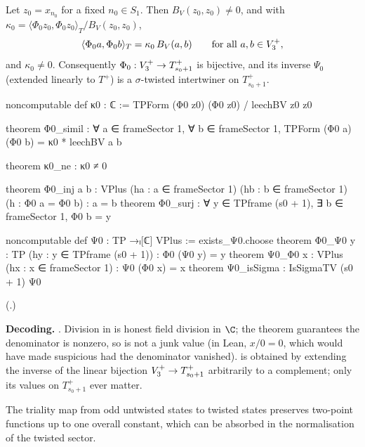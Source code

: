 \begin{theorem}[Similitude]\label{ch14:thm:simil}
Let $z_0=x_{n_0}$ for a fixed $n_0\in S_1$.  Then $B_V(z_0,z_0)\ne0$, and with
$\kappa_0=\langle\Phi_0z_0,\Phi_0z_0\rangle_T/B_V(z_0,z_0)$,
\begin{equation*}
  \langle\Phi_0a,\Phi_0b\rangle_T=\kappa_0\,B_V(a,b)\qquad\text{for all }a,b\in V_3^{+},
\end{equation*}
and $\kappa_0\ne0$.  Consequently $\Phi_0:V_3^{+}\to T_{s_0+1}^+$ is bijective, and its inverse $\Psi_0$ (extended
linearly to $T^+$) is a $\sigma$-twisted intertwiner on $T_{s_0+1}^+$.
\end{theorem}
\begin{leancode}
noncomputable def κ0 : ℂ := TPForm (Φ0 z0) (Φ0 z0) / leechBV z0 z0

theorem Φ0_simil : ∀ a ∈ frameSector 1, ∀ b ∈ frameSector 1,
    TPForm (Φ0 a) (Φ0 b) = κ0 * leechBV a b

theorem κ0_ne : κ0 ≠ 0

theorem Φ0_inj {a b : VPlus} (ha : a ∈ frameSector 1) (hb : b ∈ frameSector 1)
    (h : Φ0 a = Φ0 b) : a = b
theorem Φ0_surj : ∀ y ∈ TPframe (s0 + 1), ∃ b ∈ frameSector 1, Φ0 b = y

noncomputable def Ψ0 : TP →ₗ[ℂ] VPlus := exists_Ψ0.choose
theorem Φ0_Ψ0 {y : TP} (hy : y ∈ TPframe (s0 + 1)) : Φ0 (Ψ0 y) = y
theorem Ψ0_Φ0 {x : VPlus} (hx : x ∈ frameSector 1) : Ψ0 (Φ0 x) = x
theorem Ψ0_isSigma : IsSigmaTV (s0 + 1) Ψ0
\end{leancode}
(.)

\begin{dictionary}
\textbf{Decoding.}  .  Division in  is honest field division in $\C$;
the theorem  guarantees the denominator is nonzero, so  is not
a junk value (in Lean, $x/0=0$, which would have made  suspicious had the denominator
vanished).   is obtained by extending the inverse of the linear bijection
$V_3^{+}\to T_{s_0+1}^+$ arbitrarily to a complement; only its values on $T_{s_0+1}^+$ ever matter.
\end{dictionary}
\begin{physics}
The triality map from odd untwisted states to twisted states preserves two-point functions up to one overall constant, which can be absorbed in the normalisation of the twisted sector.
\end{physics}


